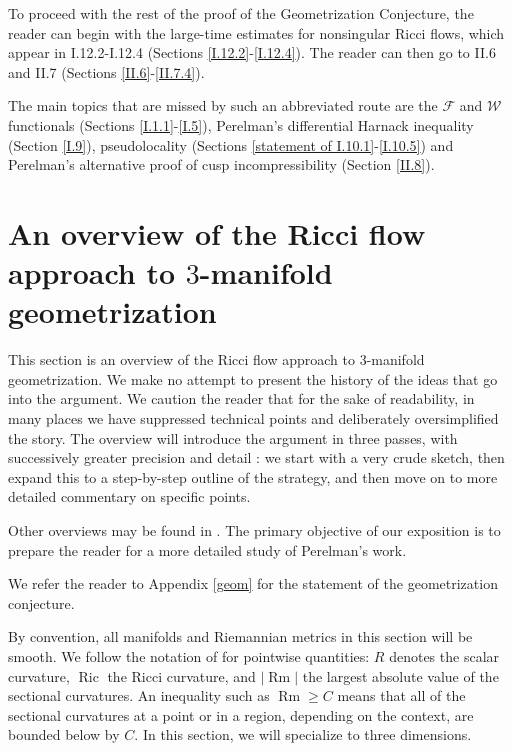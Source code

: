\documentclass[12pt]{amsart}
\newcommand{\Ric}{\operatorname{Ric}}
\newcommand{\Rm}{\operatorname{Rm}}
\numberwithin{equation}{section}
\theoremstyle{plain}
\theoremstyle{definition}
\theoremstyle{remark}
\begin{document}
To proceed with the rest of the proof of the Geometrization Conjecture, 
the reader can begin with the large-time estimates for nonsingular
Ricci flows, which appear in I.12.2-I.12.4 
(Sections \ref{I.12.2}-\ref{I.12.4}).
The reader can then go to II.6 and II.7 (Sections \ref{II.6}-\ref{II.7.4}).

The main topics that are missed by such an abbreviated route are
the ${\mathcal F}$ and ${\mathcal W}$ functionals
(Sections \ref{I.1.1}-\ref{I.5}), Perelman's differential Harnack inequality
(Section \ref{I.9}),  pseudolocality (Sections
\ref{statement of I.10.1}-\ref{I.10.5}) and Perelman's alternative proof
of cusp incompressibility (Section \ref{II.8}).




\section{An overview of the Ricci flow approach to 
$3$-manifold geometrization}
\label{overview0}

This section is an overview of the Ricci flow approach to
$3$-manifold geometrization.  We make no attempt to present the
history of the ideas that go into the argument.
We caution the reader that for the sake of readability,
in many places we have suppressed technical points and deliberately
oversimplified the story.
 The overview will introduce the argument in 
three passes, with successively greater precision and detail : we start with a 
very crude sketch, then expand this to a step-by-step outline of the 
strategy, and then move on to more detailed commentary on specific
points.  

Other overviews may be found in \cite{Cao-Chow,Morgan}.  The 
primary objective of our exposition is 
to prepare the reader for a more detailed study of Perelman's work.


We refer the reader to Appendix \ref{geom} for the statement 
of the geometrization conjecture.  

 

By convention, all manifolds and Riemannian metrics in this section 
will be smooth.
We follow the notation of
\cite{Perelman,Perelman2} for pointwise quantities:  $R$ 
denotes the scalar curvature, 
$\Ric$ the Ricci curvature,  and $|\Rm|$ the largest absolute value of 
the sectional curvatures.   
An inequality such as $\Rm\geq C$ means that all of the 
sectional curvatures at a
point or in a region, depending on the context, are bounded below by $C$.
In this section, we will specialize to three dimensions.
\end{document}
